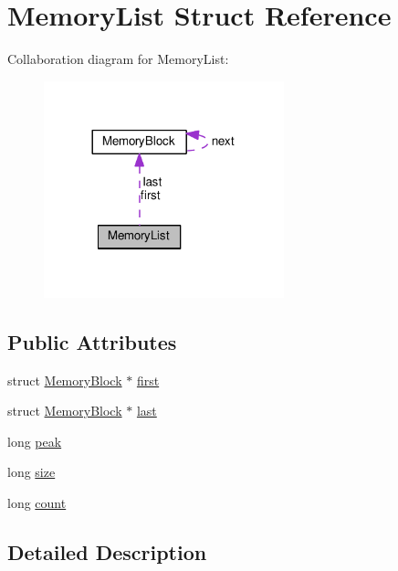 \hypertarget{structMemoryList}{}\section{Memory\+List Struct Reference}
\label{structMemoryList}


Collaboration diagram for Memory\+List\+:
\nopagebreak
\begin{figure}[H]
\begin{center}
\leavevmode
\includegraphics[width=197pt]{d6/de3/structMemoryList__coll__graph}
\end{center}
\end{figure}
\subsection*{Public Attributes}
\begin{DoxyCompactItemize}
\item 
struct \hyperlink{structMemoryBlock}{Memory\+Block} $\ast$ \hyperlink{structMemoryList_a0d47ad7371bb5f38e09ca5f35d85cecb}{first}
\item 
struct \hyperlink{structMemoryBlock}{Memory\+Block} $\ast$ \hyperlink{structMemoryList_afea5b720cf2a7c326cb53a604b90c354}{last}
\item 
long \hyperlink{structMemoryList_af2065db30ea83a216adb77fbdb59e1e4}{peak}
\item 
long \hyperlink{structMemoryList_ac481474722f97086e8316d62502c4881}{size}
\item 
long \hyperlink{structMemoryList_a6b5a62d10829b019db9b45eaf1928151}{count}
\end{DoxyCompactItemize}


\subsection{Detailed Description}


